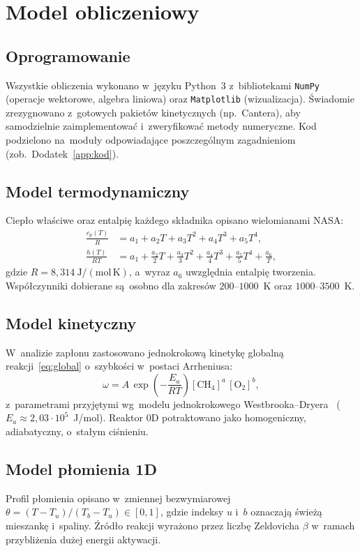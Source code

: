 \documentclass[11pt,a4paper]{article}
\begin{document}
\section{Model obliczeniowy}

\subsection{Oprogramowanie}
Wszystkie obliczenia wykonano w~języku Python~3 z~bibliotekami \texttt{NumPy}
(operacje wektorowe, algebra liniowa) oraz \texttt{Matplotlib} (wizualizacja).
Świadomie zrezygnowano z~gotowych pakietów kinetycznych (np.~Cantera), aby
samodzielnie zaimplementować i~zweryfikować metody numeryczne. Kod podzielono
na~moduły odpowiadające poszczególnym zagadnieniom (zob.~Dodatek~\ref{app:kod}).

\subsection{Model termodynamiczny}
Ciepło właściwe oraz entalpię każdego składnika opisano wielomianami NASA:
\begin{align}
  \frac{c_p(T)}{R} &= a_1 + a_2 T + a_3 T^2 + a_4 T^3 + a_5 T^4,
  \label{eq:cp}\\
  \frac{h(T)}{R T} &= a_1 + \tfrac{a_2}{2} T + \tfrac{a_3}{3} T^2
                      + \tfrac{a_4}{4} T^3 + \tfrac{a_5}{5} T^4 + \frac{a_6}{T},
  \label{eq:h}
\end{align}
gdzie $R=8{,}314\ \mathrm{J/(mol\,K)}$, a~wyraz $a_6$ uwzględnia entalpię
tworzenia. Współczynniki dobierane są~osobno dla zakresów $200$--$1000$~K
oraz $1000$--$3500$~K.

\subsection{Model kinetyczny}
W~analizie zapłonu zastosowano jednokrokową kinetykę globalną reakcji~\eqref{eq:global}
o~szybkości w~postaci Arrheniusa:
\begin{equation}
  \omega = A\,\exp\!\left(-\frac{E_a}{R T}\right)
           [\mathrm{CH_4}]^{a}\,[\mathrm{O_2}]^{b},
  \label{eq:rate}
\end{equation}
z~parametrami przyjętymi wg~modelu jednokrokowego Westbrooka--Dryera~\cite{westbrook}
($E_a\approx 2{,}03\cdot10^5$~J/mol). Reaktor 0D potraktowano jako homogeniczny,
adiabatyczny, o~stałym ciśnieniu.

\subsection{Model płomienia 1D}
Profil płomienia opisano w~zmiennej bezwymiarowej
$\theta=(T-T_u)/(T_b-T_u)\in[0,1]$, gdzie indeksy $u$ i~$b$ oznaczają świeżą
mieszankę i~spaliny. Źródło reakcji wyrażono przez liczbę Zeldovicha $\beta$
w~ramach przybliżenia dużej energii aktywacji.
\end{document}
